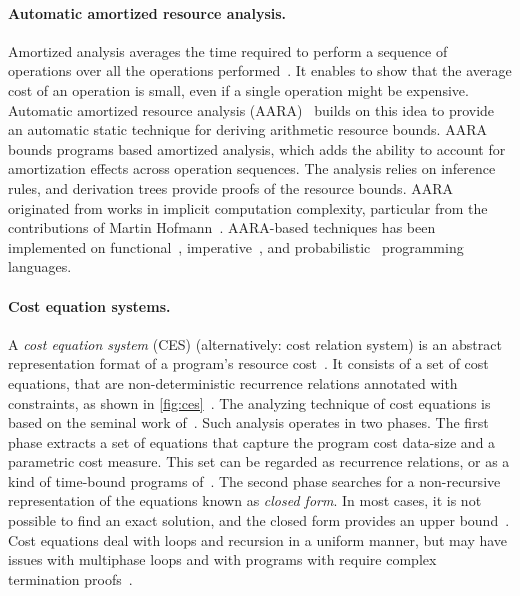 \paragraph*{Automatic amortized resource analysis.}
Amortized analysis averages the time required to perform a sequence of operations over all the operations performed~\cite[p. 451]{cormen2009}.
It enables to show that the average cost of an operation is small, even if a single operation might be expensive.
Automatic amortized resource analysis (AARA)~\cite{hoffmann2022} builds on this idea to provide an automatic static technique for deriving arithmetic resource bounds.
AARA bounds programs based amortized analysis, which adds the ability to account for amortization effects across operation sequences.
The analysis relies on inference rules, and derivation trees provide proofs of the resource bounds.
AARA originated from works in implicit computation complexity, particular from the contributions of Martin Hofmann~\cite{hoffmann2022}.
AARA-based techniques has been implemented on functional~\cite{hoffmann2017}, imperative~\cite{carbonneaux2015,carbonneaux2017}, and probabilistic~\cite{ngo2018} programming languages.

\paragraph*{Cost equation systems.}
A \emph{cost equation system} (CES) (alternatively: cost relation system) is an abstract representation format of a program's resource cost~\cite{floresmontoya2017,albert2019}.
It consists of a set of cost equations, that are non-deterministic recurrence relations annotated with constraints, as shown in \autoref{fig:ces}~\cite{floresmontoya2014}.
The analyzing technique of cost equations is based on the seminal work of~\textcite{wegbreit1975}.
Such analysis operates in two phases.
The first phase extracts a set of equations that capture the program cost \wrt data-size and a parametric cost measure.
This set can be regarded as recurrence relations, or as a kind of time-bound programs of~\textcite{rosendahl1989}.
The second phase searches for a non-recursive representation of the equations known as \emph{closed form}.
In most cases, it is not possible to find an exact solution, and the closed form provides an upper bound~\cite{albert2008}.
Cost equations deal with loops and recursion in a uniform manner,
but may have issues with multiphase loops and with programs with require complex termination proofs~\cite{floresmontoya2014}.

